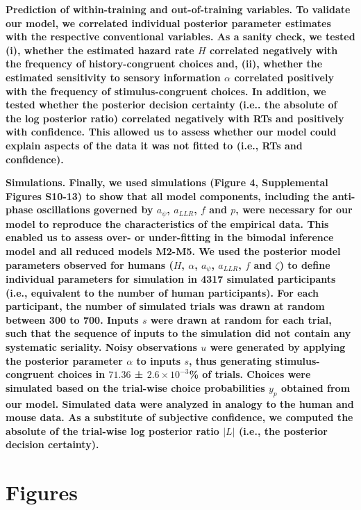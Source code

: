 \documentclass[
]{article}
\begin{document}
\textbf{Prediction of within-training and out-of-training variables. To
validate our model, we correlated individual posterior parameter
estimates with the respective conventional variables. As a sanity check,
we tested (i), whether the estimated hazard rate \(H\) correlated
negatively with the frequency of history-congruent choices and, (ii),
whether the estimated sensitivity to sensory information \(\alpha\)
correlated positively with the frequency of stimulus-congruent choices.
In addition, we tested whether the posterior decision certainty (i.e..
the absolute of the log posterior ratio) correlated negatively with RTs
and positively with confidence. This allowed us to assess whether our
model could explain aspects of the data it was not fitted to (i.e., RTs
and confidence).}

\textbf{Simulations. Finally, we used simulations (Figure 4,
Supplemental Figures S10-13) to show that all model components,
including the anti-phase oscillations governed by \(a_{\psi}\),
\(a_{LLR}\), \(f\) and \(p\), were necessary for our model to reproduce
the characteristics of the empirical data. This enabled us to assess
over- or under-fitting in the bimodal inference model and all reduced
models M2-M5. We used the posterior model parameters observed for humans
(\(H\), \(\alpha\), \(a_{\psi}\), \(a_{LLR}\), \(f\) and \(\zeta\)) to
define individual parameters for simulation in 4317 simulated
participants (i.e., equivalent to the number of human participants). For
each participant, the number of simulated trials was drawn at random
between 300 to 700. Inputs \(s\) were drawn at random for each trial,
such that the sequence of inputs to the simulation did not contain any
systematic seriality. Noisy observations \(u\) were generated by
applying the posterior parameter \(\alpha\) to inputs \(s\), thus
generating stimulus-congruent choices in \(71.36\) ±
\(\ensuremath{2.6\times 10^{-3}}\)\% of trials. Choices were simulated
based on the trial-wise choice probabilities \(y_{p}\) obtained from our
model. Simulated data were analyzed in analogy to the human and mouse
data. As a substitute of subjective confidence, we computed the absolute
of the trial-wise log posterior ratio \(|L|\) (i.e., the posterior
decision certainty).}

\newpage

\hypertarget{figures}{%
\section{Figures}\label{figures}}
\end{document}
